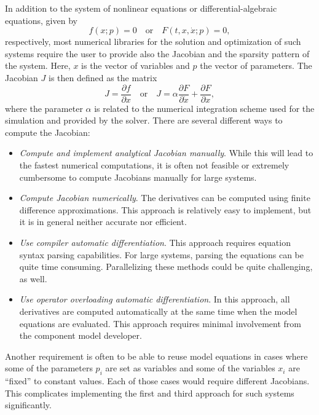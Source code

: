 \documentclass[10pt]{ijnam}
\newcommand{\pd}[2]{\frac{\partial#1}{\partial#2}} \newcommand{\unit}[1]{\ensuremath{\, \mathrm{#1}}}
\theoremstyle{definition}
\begin{document}
In addition to the system of nonlinear equations or differential-algebraic equations, given by
\begin{equation}
    f(x; p) = 0 \quad \text{or} \quad F(t, x, \dot{x}; p) = 0, \label{eq:residual}
\end{equation}
respectively, most numerical libraries for the solution and optimization of such systems require the user to provide also the Jacobian and the sparsity pattern of the system. Here, $ x $ is the vector of variables and $ p $ the vector of parameters. The Jacobian $ J $ is then defined as the matrix
\begin{equation}
    J = \pd{f}{x}
    \quad \text{or} \quad
    J = \alpha \frac{\partial F}{\partial \dot x} + \frac{\partial F}{\partial x},
    \label{eq:jacobian}
\end{equation}
where the parameter $ \alpha $ is related to the numerical integration scheme used for the simulation and provided by the solver. There are several different ways to compute the Jacobian:
\begin{itemize}[leftmargin=1em]
\item \textit{Compute and implement analytical Jacobian manually}. While this will lead to the fastest numerical computations, it is often not feasible or extremely cumbersome to compute Jacobians manually for large systems.
\item \textit{Compute Jacobian numerically}. The derivatives can be computed using finite difference approximations. This approach is relatively easy to implement, but it is in general neither accurate nor efficient.
\item \textit{Use compiler automatic differentiation}. This approach requires equation syntax parsing capabilities. For large systems, parsing the equations can be quite time consuming. Parallelizing these methods could be quite challenging, as well.
\item \textit{Use operator overloading automatic differentiation}. In this approach, all derivatives are computed automatically at the same time when the model equations are evaluated. This approach requires minimal involvement from the component model developer.
\end{itemize}
Another requirement is often to be able to reuse model equations in cases where some of the parameters $ p_i $ are set as variables and some of the variables $ x_i $ are ``fixed''  to constant values. Each of those cases would require different Jacobians. This complicates implementing the first and third approach for such systems significantly.
\end{document}
